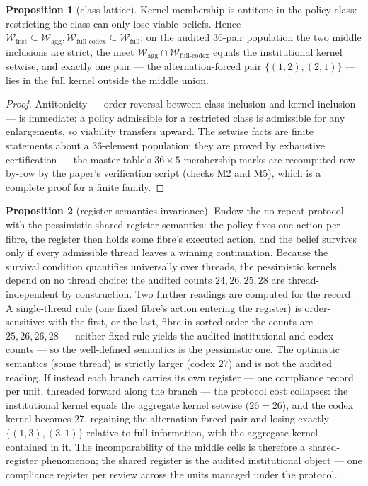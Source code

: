 \documentclass[10pt,twocolumn]{article}
\theoremstyle{definition}
\newtheorem{proposition}{Proposition}
\begin{document}
\begin{proposition}[class lattice]\label{prop:lattice}
Kernel membership is antitone in the policy class: restricting the class
can only lose viable beliefs. Hence
\(\mathcal{W}_{\mathrm{inst}} \subseteq \mathcal{W}_{\mathrm{agg}},
\mathcal{W}_{\mathrm{full\text{-}codex}} \subseteq
\mathcal{W}_{\mathrm{full}}\); on the audited 36-pair population the
two middle inclusions are strict, the meet
\(\mathcal{W}_{\mathrm{agg}} \cap
\mathcal{W}_{\mathrm{full\text{-}codex}}\) equals the institutional
kernel setwise, and exactly one pair --- the alternation-forced pair
\(\{(1,2),(2,1)\}\) --- lies in the full kernel outside the middle
union.
\end{proposition}

\begin{proof}
Antitonicity --- order-reversal between class inclusion and kernel inclusion --- is immediate: a policy admissible for a restricted class is
admissible for any enlargements, so viability transfers upward. The
setwise facts are finite statements about a 36-element population; they
are proved by exhaustive certification --- the master table's
\(36 \times 5\) membership marks are recomputed row-by-row by the paper's verification script (checks M2 and M5), which is a complete
proof for a finite family.
\end{proof}

\begin{proposition}[register-semantics invariance]\label{prop:register}
Endow the no-repeat protocol with the pessimistic shared-register
semantics: the policy fixes one action per fibre, the register then holds
some fibre's executed action, and the belief survives only if every
admissible thread leaves a winning continuation. Because the survival condition
quantifies universally over threads, the
pessimistic kernels depend on no thread choice: the audited counts
\(24, 26, 25, 28\) are thread-independent by construction. Two further
readings are computed for the record. A single-thread rule (one fixed
fibre's action entering the register) is order-sensitive: with the
first, or the last, fibre in sorted order the counts are
\(25, 26, 26, 28\) --- neither fixed rule yields the audited
institutional and codex counts --- so the well-defined semantics is the
pessimistic one. The optimistic semantics (some thread) is strictly
larger (codex \(27\)) and is not the audited reading. If instead each
branch carries its own register --- one compliance record per unit,
threaded forward along the branch --- the protocol cost collapses: the
institutional kernel equals the aggregate kernel setwise (\(26 = 26\)),
and the codex kernel becomes \(27\), regaining the alternation-forced
pair and losing exactly \(\{(1,3),(3,1)\}\) relative to full
information, with the aggregate kernel contained in it. The
incomparability of the middle cells is therefore a shared-register
phenomenon; the shared register is the audited institutional object ---
one compliance register per review across the units managed under the
protocol.
\end{proposition}
\end{document}
